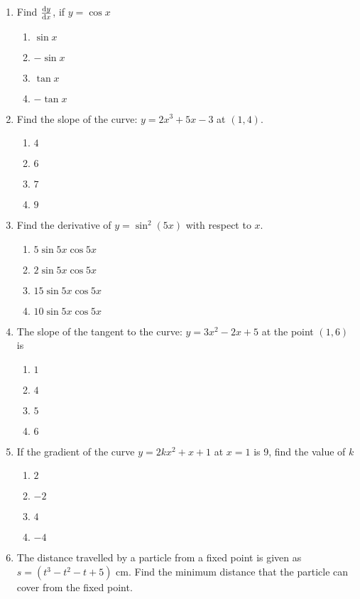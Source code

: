 \begin{multicols}{2}
\begin{enumerate}[label={\arabic*.}]
\begin{enumerate}[label={\Alph*.}]
	\end{enumerate}
\item Find \(\dv{y}{x}\), if \(y = \cos{x}\)
	\begin{enumerate}[label={\Alph*.}]
	\item \(\sin{x}\)
	\item \(-\sin{x}\)
	\item \(\tan{x}\)
	\item \(-\tan{x}\)
	\end{enumerate}
\item Find the slope of the curve: \(y = 2{x}^{3}+ 5{x}-3\) at \((1,4)\).
	\begin{enumerate}[label={\Alph*.}]
	\item \(4\)
	\item \(6\)
	\item \(7\)
	\item \(9\)
	\end{enumerate}
\item Find the derivative of \(y = \sin^{2}{(5x)}\) with respect to \(x\).
	\begin{enumerate}[label={\Alph*.}]
	\item \(5 \sin{5x\cos{5x}}\)
	\item \(2 \sin{5x\cos{5x}}\)
	\item \(15 \sin{5x\cos{5x}}\)
	\item \(10 \sin{5x\cos{5x}}\)
	\end{enumerate}
\item The slope of the tangent to the curve: \(y = 3{x}^{2}-2x+5\) at the point \((1,6)\) is
	\begin{enumerate}[label={\Alph*.}]
	\item \(1\)
	\item \(4\)
	\item \(5\)
	\item \(6\)
	\end{enumerate}
\item If the gradient of the curve \(y = 2k{x}^{2} + x + 1\) at \(x = 1\) is 9, find the value of \(k\)
	\begin{enumerate}[label={\Alph*.}]
	\item \(2\)
	\item \(-2\)
	\item \(4\)
	\item \(-4\)
	\end{enumerate}
\item The distance travelled by a particle from a fixed point is given as \(s = \left({t}^{3} - {t}^{2} - t + 5\right)\) cm. Find the minimum distance that the particle can cover from the fixed point.

\end{enumerate}
\end{multicols}
